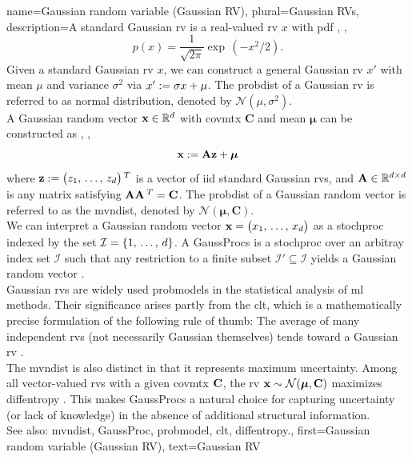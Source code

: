 {name={Gaussian random variable (Gaussian RV)}, 
	plural={Gaussian RVs}, 
	description={A  standard Gaussian \gls{rv} is a 
		real-valued \gls{rv} $x$ with \gls{pdf} \cite{BertsekasProb}, \cite{GrayProbBook}, \cite{papoulis}
		\begin{equation}
			\nonumber
			p(x) = \frac{1}{\sqrt{2\pi}} \exp\,(-x^2/2). 
		\end{equation}
		Given a standard Gaussian \gls{rv} $x$, we can construct a general Gaussian \gls{rv} $x'$ with 
		\gls{mean} $\mu$ and \gls{variance} $\sigma^2$ via $x' := \sigma x + \mu$. The \gls{probdist} of a 
		Gaussian \gls{rv} is referred to as normal distribution, denoted by $\mathcal{N}(\mu, \sigma^2)$. 
		\\ 
		A Gaussian random \gls{vector} ${\bf x} \in \mathbb{R}^{d}$ with 
		\gls{covmtx} $\mathbf{C}$ and \gls{mean} ${\bm \mu}$ can be constructed as \cite{GrayProbBook}, \cite{papoulis}, \cite{Lapidoth09}
		\[
		{\bf x} := \mathbf{A} {\bf z} + {\bm \mu}
		\]
		where ${\bf z} := \big( z_{1}, \,\ldots, \,z_{d} \big)\,^{T}$ is a \gls{vector} 
		of \gls{iid} standard Gaussian \glspl{rv}, and ${\bf A} \in \mathbb{R}^{d \times d}$ is any \gls{matrix} satisfying ${\bf A} {\bf A}\,^{T} = {\bf C}$. 
		The \gls{probdist} of a Gaussian random \gls{vector} is referred to as the \gls{mvndist}, 
		denoted by $\mathcal{N}({\bm \mu}, \mathbf{C})$.
		\\
		We can interpret a Gaussian random \gls{vector} ${\bf x}=\big(x_{1},\,\ldots,\,x_{d}\big)$ as a \gls{stochproc} 
		indexed by the set $\mathcal{I}=\{1,\,\ldots,\,d\}$. A \glspl{GaussProc} is a 
		\gls{stochproc} over an arbitray index set $\mathcal{I}$ such that any restriction to a finite subset 
		$\mathcal{I}' \subseteq \mathcal{I}$ yields a Gaussian random \gls{vector} \cite{Rasmussen2006Gaussian}.
  		\\
        		Gaussian \glspl{rv} are widely used \glspl{probmodel} in the statistical analysis of 
        		\gls{ml} methods. Their significance arises partly from the \gls{clt}, which is a mathematically 
        		precise formulation of the following rule of thumb: The average of many independent \glspl{rv} 
		(not necessarily Gaussian themselves) tends toward a Gaussian \gls{rv} \cite{ross2013first}.
		\\ 
		The \gls{mvndist} is also distinct in that it represents \gls{maximum} \gls{uncertainty}. 
		Among all \gls{vector}-valued \glspl{rv} with a given \gls{covmtx} ${\bf C}$, the \gls{rv} ${\bf x} \sim \mathcal{N}({\bm \mu}, \mathbf{C})$ 
		maximizes \gls{diffentropy} \cite[Th. 8.6.5]{coverthomas}. This makes \glspl{GaussProc} a 
		natural choice for capturing \gls{uncertainty} (or lack of knowledge) in the absence of additional 
		structural information.
		\\ 
		See also: \gls{mvndist}, \gls{GaussProc}, \gls{probmodel}, \gls{clt}, \gls{diffentropy}.},
	first={Gaussian random variable (Gaussian RV)},
	text={Gaussian RV}
}
	
